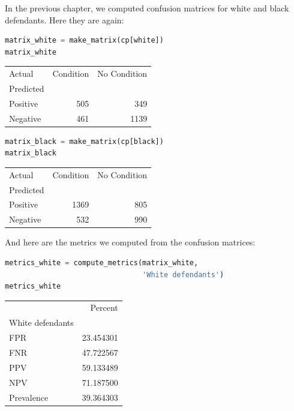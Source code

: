 In the previous chapter, we computed confusion matrices for white and
black defendants. Here they are again:

\begin{lstlisting}[language=Python,style=source]
matrix_white = make_matrix(cp[white])
matrix_white
\end{lstlisting}

\begin{tabular}{lrr}
\toprule
Actual &  Condition &  No Condition \\
Predicted &            &               \\
\midrule
Positive  &        505 &           349 \\
Negative  &        461 &          1139 \\
\bottomrule
\end{tabular}

\begin{lstlisting}[language=Python,style=source]
matrix_black = make_matrix(cp[black])
matrix_black
\end{lstlisting}

\begin{tabular}{lrr}
\toprule
Actual &  Condition &  No Condition \\
Predicted &            &               \\
\midrule
Positive  &       1369 &           805 \\
Negative  &        532 &           990 \\
\bottomrule
\end{tabular}

And here are the metrics we computed from the confusion matrices:

\begin{lstlisting}[language=Python,style=source]
metrics_white = compute_metrics(matrix_white, 
                                'White defendants')
metrics_white
\end{lstlisting}

\begin{tabular}{lr}
\toprule
{} &    Percent \\
White defendants &            \\
\midrule
FPR              &  23.454301 \\
FNR              &  47.722567 \\
PPV              &  59.133489 \\
NPV              &  71.187500 \\
Prevalence       &  39.364303 \\
\bottomrule
\end{tabular}


